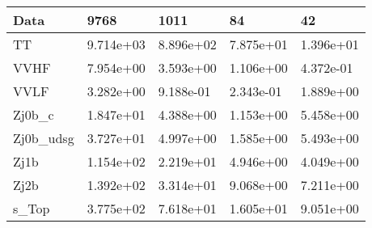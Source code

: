 \begin{table}
{\begin{tabularx}{\textwidth}{|X|X|X|X|X|}
\hline
Data & 9768 & 1011 & 84 & 42 \\
\hline
TT & 9.714e+03 & 8.896e+02 & 7.875e+01 & 1.396e+01 \\
VVHF & 7.954e+00 & 3.593e+00 & 1.106e+00 & 4.372e-01 \\
VVLF & 3.282e+00 & 9.188e-01 & 2.343e-01 & 1.889e+00 \\
Zj0b\_c & 1.847e+01 & 4.388e+00 & 1.153e+00 & 5.458e+00 \\
Zj0b\_udsg & 3.727e+01 & 4.997e+00 & 1.585e+00 & 5.493e+00 \\
Zj1b & 1.154e+02 & 2.219e+01 & 4.946e+00 & 4.049e+00 \\
Zj2b & 1.392e+02 & 3.314e+01 & 9.068e+00 & 7.211e+00 \\
s\_Top & 3.775e+02 & 7.618e+01 & 1.605e+01 & 9.051e+00 \\
\hline
\end{tabularx}
}
\label{tab:cr-Zee-2016}
\end{table}

